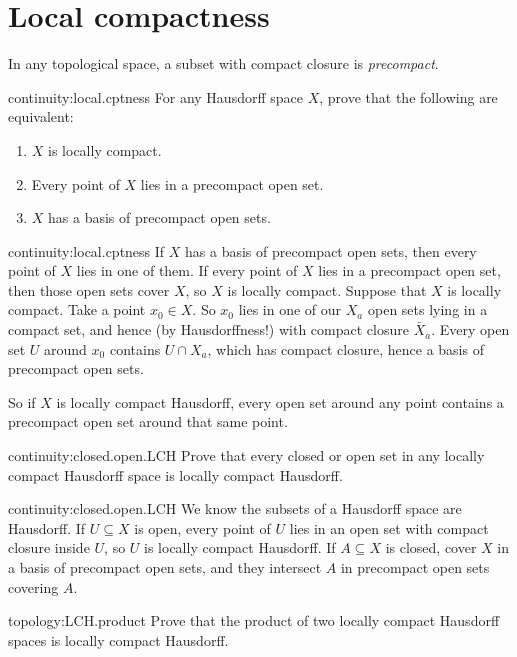 \section{Local compactness}
In any topological space, a subset with compact closure is \emph{precompact}.
\begin{problem}{continuity:local.cptness}
For any Hausdorff space \(X\), prove that the following are equivalent:
\begin{enumerate}
\item
\(X\) is locally compact.
\item
Every point of \(X\) lies in a precompact open set.
\item
\(X\) has a basis of precompact open sets.
\end{enumerate}
\end{problem}
\begin{answer}{continuity:local.cptness}
If \(X\) has a basis of precompact open sets, then every point of \(X\) lies in one of them.
If every point of \(X\) lies in a precompact open set, then those open sets cover \(X\), so \(X\) is locally compact.
Suppose that \(X\) is locally compact.
Take a point \(x_0\in X\).
So \(x_0\) lies in one of our \(X_a\) open sets lying in a compact set, and hence (by Hausdorffness!) with compact closure \(\bar{X}_a\).
Every open set \(U\) around \(x_0\) contains \(U\cap X_a\), which has compact closure, hence a basis of precompact open sets.
\end{answer}
So if \(X\) is locally compact Hausdorff, every open set around any point contains a precompact open set around that same point.
\begin{problem}{continuity:closed.open.LCH}
Prove that every closed or open set in any locally compact Hausdorff space is locally compact Hausdorff.
\end{problem}
\begin{answer}{continuity:closed.open.LCH}
We know the subsets of a Hausdorff space are Hausdorff.
If \(U\subseteq X\) is open, every point of \(U\) lies in an open set with compact closure inside \(U\), so \(U\) is locally compact Hausdorff.
If \(A\subseteq X\) is closed, cover \(X\) in a basis of precompact open sets, and they intersect \(A\) in precompact open sets covering \(A\).
\end{answer}
\begin{problem}{topology:LCH.product}
Prove that the product of two locally compact Hausdorff spaces is locally compact Hausdorff.
\end{problem}
